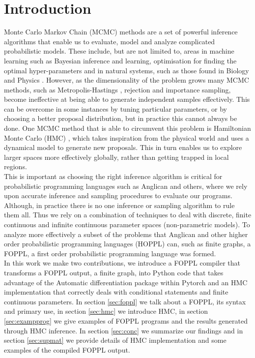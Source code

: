 \section{Introduction}

Monte Carlo Markov Chain (MCMC) methods are a set of powerful inference algorithms \citep{berg2008markov} that enable us to evaluate, model and analyze complicated probabilistic models. These include, but are not limited to, areas in machine learning such as Bayesian inference and learning, optimisation for finding the optimal hyper-parameters \citep{andrieu2003introduction} and in natural systems, such as those found in Biology \citep{sorensen2007likelihood} and Physics \citep{duane1987hybrid}. 
However, as the dimensionality of the problem grows many MCMC methods, such as Metropolis-Hastings \citep{hastings1970monte}, rejection and importance sampling,  become ineffective at being able to generate independent samples effectively. This can be overcome in some instances by tuning particular parameters, or by choosing a better proposal distribution, but in practice this cannot always be done. One MCMC method that is able to circumvent this problem is Hamiltonian Monte Carlo (HMC) \citep{neal2011mcmc}\citep{duane1987hybrid}, which takes inspiration from the physical world and uses a dynamical model to generate new proposals. This in turn enables us to explore larger spaces more effectively globally, rather than getting trapped in local regions. \\
This is important as choosing the right inference algorithm is critical for probabilistic programming languages \citep{tolpin2015probabilistic} such as Anglican \citep{wood2014new} and others, where we rely upon accurate inference and sampling procedures to evaluate our programs. Although, in practice there is no one inference or sampling algorithm to rule them all. Thus we rely on a combination of techniques to deal with discrete, finite continuous and infinite continuous parameter spaces (non-parametric models). To analyze more effectively a subset of the problems that Anglican and other higher order probabilistic programming languages (HOPPL) can, such as finite graphs, a FOPPL, a first order probabilistic programming language was formed.\\
In this work we make two contributions, we introduce a FOPPL compiler that transforms a FOPPL output, a finite graph, into Python code that takes advantage of the Automatic differentiation package within Pytorch \citep{pytorch} and an HMC implementation that correctly deals with conditional statements and finite continuous parameters.
In section \ref{sec:foppl} we talk about a FOPPL, its syntax and primary use, in section \ref{sec:hmc} we introduce HMC, in section \ref{sec:exampprog} we give examples of FOPPL programs and the results generated through HMC inference. In section \ref{sec:conc} we summarize our findings and in section \ref{sec:supmat} we provide details of HMC implementation and some examples of the compiled FOPPL output. 